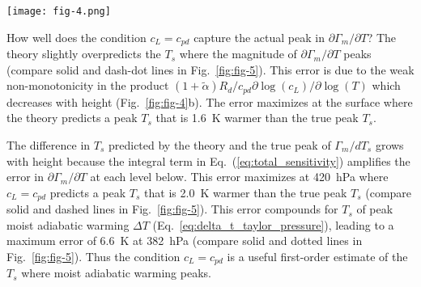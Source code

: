 \documentclass[draft,twocol]{ametsocV6.1}
\begin{document}
\begin{figure*}[htbp]
 \centering
 \texttt{[image: fig-4.png]}\\
 \caption{The latent heat capacity sensitivity is decomposed into a product of four terms (Eq.~\ref{eq:term_b_intermediate}) that varies monotonically with local temperature $T$, where local means at pressure $p$. (a) The latent volume ratio $\tilde{\alpha}$ increases exponentially with $T$ (dashed) while the fractional change in latent heat capacity $c_L$ to a fractional change in $T$ decreases approximately linearly with $T$ (dotted). The product of the two is weakly non-monotonic with $T$ where the product has a local minimum (dash-dot). (b) The local minimum across the pressure-surface temperature space approximately occurs where $\tilde{\alpha}= R_v T / L_v$ (white line). (c) The latent fraction of effective heat capacity $f_L$ increases logistically with $T$ (blue line) while the sensible fraction $f_d$ decreases logistically with $T$ (red line). The product of the two is non-monotonic with $T$ where the product has a local maximum (purple line). (d) The $f_d\cdot f_L$ local maximum across the pressure-surface temperature space occurs where $c_L=c_{pd}$ (black line).}\label{fig:fig-4}
\end{figure*}

How well does the condition $c_L = c_{pd}$ capture the actual peak in $\partial\Gamma_m/\partial T$? The theory slightly overpredicts the $T_s$ where the magnitude of $\partial\Gamma_m/\partial T$ peaks (compare solid and dash-dot lines in Fig.~\ref{fig:fig-5}). This error is due to the weak non-monotonicity in the product $(1+\tilde{\alpha})R_d/c_{pd}\partial\log(c_L)/\partial\log(T)$ which decreases with height (Fig.~\ref{fig:fig-4}b). The error maximizes at the surface where the theory predicts a peak $T_s$ that is 1.6~K warmer than the true peak $T_s$. 

The difference in $T_s$ predicted by the theory and the true peak of $\Gamma_m / d T_s$ grows with height because the integral term in Eq.~(\ref{eq:total_sensitivity}) amplifies the error in $\partial\Gamma_m / \partial T$ at each level below. This error maximizes at 420~hPa where $c_L = c_{pd}$ predicts a peak $T_s$ that is 2.0~K warmer than the true peak $T_s$ (compare solid and dashed lines in Fig.~\ref{fig:fig-5}). This error compounds for $T_s$ of peak moist adiabatic warming $\Delta T$ (Eq.~\ref{eq:delta_t_taylor_pressure}), leading to a maximum error of 6.6~K at 382~hPa (compare solid and dotted lines in Fig.~\ref{fig:fig-5}). Thus the condition $c_L = c_{pd}$ is a useful first-order estimate of the $T_s$ where moist adiabatic warming peaks.
\end{document}
